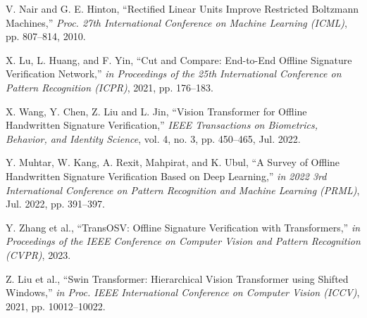 \begin{thebibliography}{10}
V. Nair and G. E. Hinton, ``Rectified Linear Units Improve Restricted Boltzmann Machines,'' {\em Proc. 27th International Conference on Machine Learning (ICML)}, pp. 807--814,
2010.

X. Lu, L. Huang, and F. Yin, ``Cut and Compare: End-to-End Offline Signature Verification Network,'' {\em in Proceedings of the 25th International Conference on Pattern Recognition (ICPR)},
2021, pp. 176--183.

X. Wang, Y. Chen, Z. Liu and L. Jin, ``Vision Transformer for Offline Handwritten Signature Verification,'' {\em IEEE Transactions on Biometrics, Behavior, and Identity Science}, vol. 4, no. 3, pp. 450--465,
Jul. 2022.

Y. Muhtar, W. Kang, A. Rexit, Mahpirat, and K. Ubul, ``A Survey of Offline Handwritten Signature Verification Based on Deep Learning,'' {\em in 2022 3rd International Conference on Pattern Recognition and Machine Learning (PRML)},
Jul. 2022, pp. 391--397.

Y. Zhang et al., ``TransOSV: Offline Signature Verification with Transformers,'' {\em in Proceedings of the IEEE Conference on Computer Vision and Pattern Recognition (CVPR)},
2023.

Z. Liu et al., ``Swin Transformer: Hierarchical Vision Transformer using Shifted Windows,'' {\em in Proc. IEEE International Conference on Computer Vision (ICCV)},
2021, pp. 10012--10022.

\end{thebibliography}
